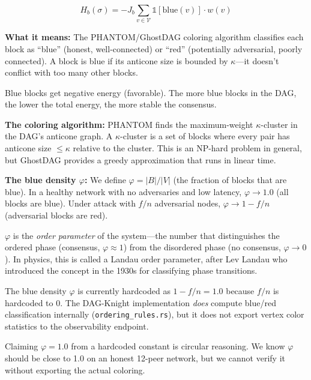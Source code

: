 \documentclass[11pt,a4paper]{article}
\begin{document}
\begin{blackboard}
\begin{equation}
H_b(\sigma) = -J_b \sum_{v \in \mathcal{V}} \mathbb{1}[\mathrm{blue}(v)] \cdot w(v)
\end{equation}

\textbf{What it means:} The PHANTOM/GhostDAG coloring algorithm classifies each block as ``blue'' (honest, well-connected) or ``red'' (potentially adversarial, poorly connected). A block is blue if its anticone size is bounded by $\kappa$---it doesn't conflict with too many other blocks.

Blue blocks get negative energy (favorable). The more blue blocks in the DAG, the lower the total energy, the more stable the consensus.

\textbf{The coloring algorithm:} PHANTOM finds the maximum-weight $\kappa$-cluster in the DAG's anticone graph. A $\kappa$-cluster is a set of blocks where every pair has anticone size $\leq \kappa$ relative to the cluster. This is an NP-hard problem in general, but GhostDAG provides a greedy approximation that runs in linear time.

\textbf{The blue density $\varphi$:} We define $\varphi = |B|/|V|$ (the fraction of blocks that are blue). In a healthy network with no adversaries and low latency, $\varphi \to 1.0$ (all blocks are blue). Under attack with $f/n$ adversarial nodes, $\varphi \to 1 - f/n$ (adversarial blocks are red).

$\varphi$ is the \emph{order parameter} of the system---the number that distinguishes the ordered phase (consensus, $\varphi \approx 1$) from the disordered phase (no consensus, $\varphi \to 0$). In physics, this is called a Landau order parameter, after Lev Landau who introduced the concept in the 1930s for classifying phase transitions.
\end{blackboard}

\begin{honesty}
The blue density $\varphi$ is currently hardcoded as $1 - f/n = 1.0$ because $f/n$ is hardcoded to 0. The DAG-Knight implementation \emph{does} compute blue/red classification internally (\texttt{ordering\_rules.rs}), but it does not export vertex color statistics to the observability endpoint.

Claiming $\varphi = 1.0$ from a hardcoded constant is circular reasoning. We know $\varphi$ should be close to 1.0 on an honest 12-peer network, but we cannot verify it without exporting the actual coloring.
\end{honesty}
\end{document}
